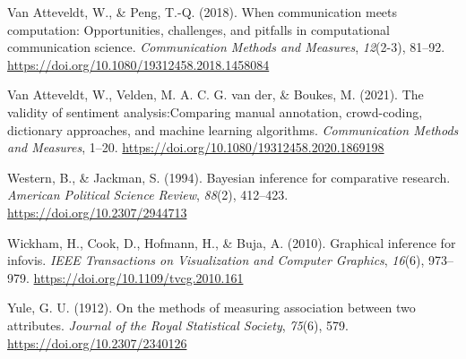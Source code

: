 \documentclass[english,man,floatsintext]{apa6}
\begin{document}
\leavevmode\hypertarget{ref-atteveldt:2018:wcm}{}%
Van Atteveldt, W., \& Peng, T.-Q. (2018). When communication meets computation: Opportunities, challenges, and pitfalls in computational communication science. \emph{Communication Methods and Measures}, \emph{12}(2-3), 81--92. \url{https://doi.org/10.1080/19312458.2018.1458084}

\leavevmode\hypertarget{ref-atteveldt:2021:VSA}{}%
Van Atteveldt, W., Velden, M. A. C. G. van der, \& Boukes, M. (2021). The validity of sentiment analysis:Comparing manual annotation, crowd-coding, dictionary approaches, and machine learning algorithms. \emph{Communication Methods and Measures}, 1--20. \url{https://doi.org/10.1080/19312458.2020.1869198}

\leavevmode\hypertarget{ref-western:1994:BIC}{}%
Western, B., \& Jackman, S. (1994). Bayesian inference for comparative research. \emph{American Political Science Review}, \emph{88}(2), 412--423. \url{https://doi.org/10.2307/2944713}

\leavevmode\hypertarget{ref-wickham:2010:G}{}%
Wickham, H., Cook, D., Hofmann, H., \& Buja, A. (2010). Graphical inference for infovis. \emph{IEEE Transactions on Visualization and Computer Graphics}, \emph{16}(6), 973--979. \url{https://doi.org/10.1109/tvcg.2010.161}

\leavevmode\hypertarget{ref-yule:1912:MMA}{}%
Yule, G. U. (1912). On the methods of measuring association between two attributes. \emph{Journal of the Royal Statistical Society}, \emph{75}(6), 579. \url{https://doi.org/10.2307/2340126}

\endgroup
\end{document}
